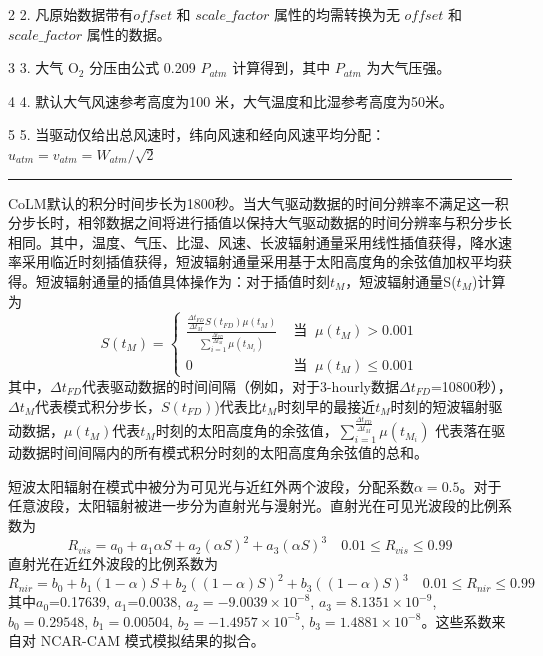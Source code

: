 \begin{landscape}
\begin{tablenotes}
\item[2] 2. 凡原始数据带有$offset$ 和 $scale\_{factor}$ 属性的均需转换为无 $offset$ 和$scale\_{factor}$ 属性的数据。

\item[3] 3. 大气 $\mathrm{O_2}$ 分压由公式 0.209 $P_{atm}$ 计算得到，其中 $P_{atm}$ 为大气压强。

\item[4] 4. 默认大气风速参考高度为100 米，大气温度和比湿参考高度为50米。

\item[5] 5. 当驱动仅给出总风速时，纬向风速和经向风速平均分配：$u_{atm}=v_{atm}=W_{atm}/\sqrt2$

\end{tablenotes}
\rule{\linewidth}{0.8pt}
\end{landscape}





CoLM默认的积分时间步长为1800秒。当大气驱动数据的时间分辨率不满足这一积分步长时，相邻数据之间将进行插值以保持大气驱动数据的时间分辨率与积分步长相同。其中，温度、气压、比湿、风速、长波辐射通量采用线性插值获得，降水速率采用临近时刻插值获得，短波辐射通量采用基于太阳高度角的余弦值加权平均获得。短波辐射通量的插值具体操作为：对于插值时刻$t_M$，短波辐射通量S($t_M$)计算为
\begin{equation}\label{t_M}
S\left(t_{M}\right)=\left\{\begin{array}{ll}\frac{\frac{\Delta t_{FD}}{\Delta t_{M}} S\left(t_{F D}\right) \mu\left(t_{M}\right)}{\sum_{i=1}^{\frac{\Delta t_{FD}}{\Delta t_{M}}} \mu\left(t_{M_{i}}\right)} & \text { 当 }\ \mu\left(t_{M}\right)>0.001 \\
0 & \text { 当 }\ \mu\left(t_{M}\right) \leq 0.001\end{array}\right.
\end{equation}
其中，$\Delta t_{FD}$代表驱动数据的时间间隔（例如，对于3-hourly数据$\Delta t_{FD}$=10800秒），$\Delta t_{M}$代表模式积分步长，$S(t_{FD})$)代表比$t_M$时刻早的最接近$t_M$时刻的短波辐射驱动数据，$\mu\left(t_M\right)$代表$t_M$时刻的太阳高度角的余弦值，$
\sum_{i=1}^{\frac{\Delta t_{F D}}{\Delta t_{M}}} \mu\left(t_{M_{i}}\right)$
代表落在驱动数据时间间隔内的所有模式积分时刻的太阳高度角余弦值的总和。

短波太阳辐射在模式中被分为可见光与近红外两个波段，分配系数$\alpha=0.5$。对于任意波段，太阳辐射被进一步分为直射光与漫射光。直射光在可见光波段的比例系数为
\begin{equation}\label{R_vis}
R_{vis}=a_{0}+a_{1} \alpha S+a_{2}(\alpha S)^{2}+a_{3}(\alpha S)^{3} \quad 0.01 \leq R_{vis} \leq 0.99
\end{equation}
直射光在近红外波段的比例系数为
\begin{equation}
R_{nir}=b_{0}+b_{1}(1-\alpha) S+b_{2}((1-\alpha) S)^{2}+b_{3}((1-\alpha) S)^{3} \quad 0.01 \leq R_{nir} \leq 0.99
\end{equation}
其中$a_0$=0.17639, $a_1$=0.0038, $a_2=-9.0039\times{10}^{-8}$, $a_3=8.1351\times10^{-9}$, $b_0=0.29548$, $b_1=0.00504$, $b_2=-1.4957\times10^{-5}$, $b_3=1.4881\times10^{-8}$。这些系数来自对 NCAR-CAM 模式模拟结果的拟合。

